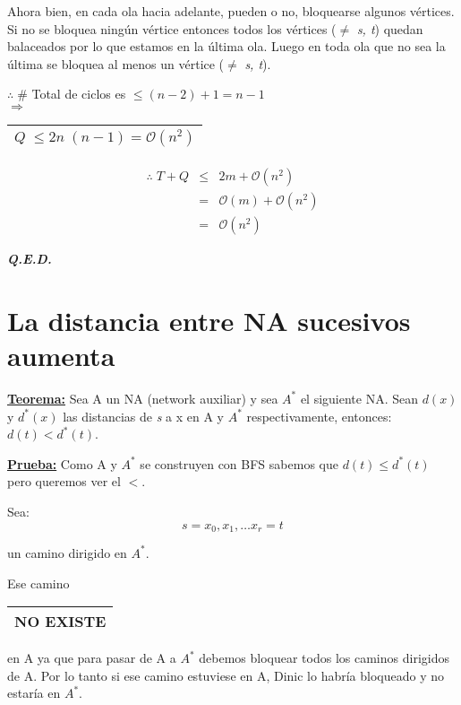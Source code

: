 \documentclass[12pt,a4paper]{report}
\newcounter{neq}
\newcommand{\QED}{\hfill \textit{\textbf{Q.E.D.}}}
\begin{document}
				\par Ahora bien, en cada ola hacia adelante, pueden o no, bloquearse algunos vértices. Si no se bloquea ningún vértice entonces todos los vértices ($\neq$ \textit{s, t}) quedan balaceados por lo que estamos en la última ola. Luego en toda ola que no sea la última se bloquea al menos un vértice ($\neq$ \textit{s, t}).
				\begin{center}
					$\therefore \; \#$ Total de ciclos es $\leq (n - 2) + 1 = n - 1$ \\
					\vspace{3mm}
					$\Rightarrow$ \begin{tabular}{|c|} \hline $Q \; \leq 2 n \; (n - 1) = \mathcal{O}(n^{2})$ \\ \hline \end{tabular}
				\end{center}

				\begin{eqnarray}
					\nonumber \therefore \; T + Q &\leq & 2 m + \mathcal{O}(n^{2}) \\
					\nonumber &=& \mathcal{O}(m) + \mathcal{O}(n^{2}) \\
					\nonumber &=& \mathcal{O}(n^{2})
				\end{eqnarray}

		\QED

	\section{La distancia entre NA sucesivos aumenta}
		\textbf{\underline{Teorema:}} Sea A un NA (network auxiliar) y sea $A^{*}$ el siguiente NA. Sean $d(x)$ y $d^{*}(x)$ las distancias de \textit{s} a x en A y $A^{*}$ respectivamente, entonces: $d(t) < d^{*}(t)$.

		\textbf{\underline{Prueba:}} Como A y $A^{*}$ se construyen con BFS sabemos que $d(t) \leq d^{*}(t)$ pero queremos ver el $<$.
			\par Sea:
			\[ s = x_{0}, x_{1}, \dotsc x_{r} = t \]
			\par un camino dirigido en $A^{*}$.
			\par Ese camino \begin{tabular}{|c|} \hline NO EXISTE \\\hline \end{tabular} en A ya que para pasar de A a $A^{*}$ debemos bloquear todos los caminos dirigidos de A. Por lo tanto si ese camino estuviese en A, Dinic lo habría bloqueado y no estaría en $A^{*}$.
\end{document}
